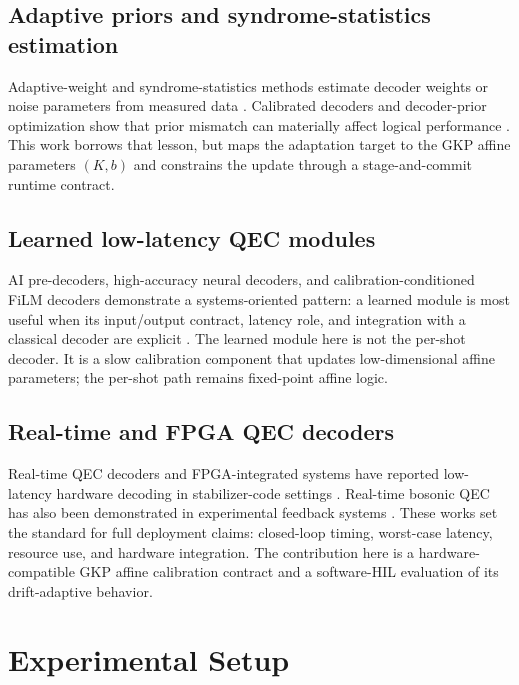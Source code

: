 \documentclass[11pt]{article}
\begin{document}
\subsection{Adaptive priors and syndrome-statistics estimation}

Adaptive-weight and syndrome-statistics methods estimate decoder weights or
noise parameters from measured data \cite{spitz2018,wagner2021,dgr2023}.
Calibrated decoders and decoder-prior optimization show that prior mismatch can
materially affect logical performance \cite{chen2022,sivak2024}.  This work
borrows that lesson, but maps the adaptation target to the GKP affine
parameters \((K,b)\) and constrains the update through a stage-and-commit
runtime contract.

\subsection{Learned low-latency QEC modules}

AI pre-decoders, high-accuracy neural decoders, and calibration-conditioned
FiLM decoders demonstrate a systems-oriented pattern: a learned module is most
useful when its input/output contract, latency role, and integration with a
classical decoder are explicit \cite{chamberland2026,stein2026,
google2023decoder}.  The learned module here is not the per-shot decoder.  It
is a slow calibration component that updates low-dimensional affine
parameters; the per-shot path remains fixed-point affine logic.

\subsection{Real-time and FPGA QEC decoders}

Real-time QEC decoders and FPGA-integrated systems have reported low-latency
hardware decoding in stabilizer-code settings \cite{caune2024,yang2026,
ziad2024,maurer2025}.  Real-time bosonic QEC has also been demonstrated in
experimental feedback systems \cite{sivak2023,lachance2024}.  These works set
the standard for full deployment claims: closed-loop timing, worst-case
latency, resource use, and hardware integration.  The contribution here is a
hardware-compatible GKP affine calibration contract and a software-HIL
evaluation of its drift-adaptive behavior.

\section{Experimental Setup}
\end{document}
